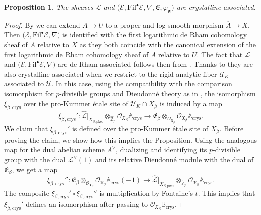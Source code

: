 \documentclass[asterisque,english]{smfart}
\newtheorem{proposition}[theo]{Proposition}
\begin{document}
\begin{proposition}\label{prop:crysass} The sheaves $\mathcal{L}$ and  $\bigl(\mathcal{E},\mathrm{Fil}^\bullet \mathcal{E}, \nabla,\mathfrak{E},\varphi_{\mathfrak{E}}\bigr) $ are crystalline associated.
\end{proposition}
\begin{proof}  By \cite[Thm.~VI.1.1]{FC} we can extend $A\to U$ to a proper and log smooth morphism $\overline{A}\to X$.  Then $ \bigl(\mathcal{E},\mathrm{Fil}^\bullet \mathcal{E}, \nabla\bigr)$ is identified with the first logarithmic de Rham cohomology sheaf of $\overline{A}$ relative to $X$ as they both coincide with the canonical extension of the first logarithmic de Rham cohomology sheaf of $A$ relative to $U$. The fact that $\mathcal{L}$ and $ \bigl(\mathcal{E},\mathrm{Fil}^\bullet \mathcal{E}, \nabla\bigr)$  are de Rham associated follows then from \cite[Theorem 3.2.7(5)]{DLLZb}.
Thanks to  \cite[Theorem 5.5]{TT} they are also crystalline associated when we restrict to the rigid analytic 
fiber $\mathcal{U}_K$ associated to $\mathcal{U}$.  In this case, using the compatibility with the comparison isomorphism for $p$-divisible groups and Dieudonn\'e theory as in \cite[\S 3.5]{SW},
the isomorphism $\xi_{\beta,\mathrm{crys}}$  over the pro-Kummer \'etale site of $\mathcal{U}_K \cap X_{\beta} $  is induced by a map 
$$\xi_{\beta,\mathrm{crys}}'\colon \widehat{\mathcal{L}}\vert_{X_{\beta,\mathrm{pket}}}\otimes_{\widehat{\mathbb{Z}}_p} \mathcal{O}_{\mathfrak{X}_\beta} \mathbb{A}_{\mathrm{crys}}\longrightarrow  \mathfrak{E}_\beta\otimes_{\mathcal{O}_{\mathfrak{X}_\beta}}  \mathcal{O}_{\mathfrak{X}_\beta}\mathbb{A}_{\mathrm{crys}}.$$We claim that $\xi_{\beta,\mathrm{crys}}'$ is defined over the pro-Kummer \'etale site of $X_{\beta} $. Before proving the claim, we show how this implies the Proposition. Using the analogous map for the dual abelian scheme $A^\vee$, dualizing and identifying its $p$-divisible group with the dual $\mathcal{L}^\vee(1)$ and its relative Dieudonn\'e module with the dual of $\mathfrak{E}_\beta$,  we get a map  $$\xi_{\beta,\mathrm{crys}}''\colon  \mathfrak{E}_\beta\otimes_{\mathcal{O}_{\mathfrak{X}_\beta}}  \mathcal{O}_{\mathfrak{X}_\beta}\mathbb{A}_{\mathrm{crys}}(-1)\longrightarrow \widehat{\mathcal{L}}\vert_{X_{\beta,\mathrm{pket}}}\otimes_{\widehat{\mathbb{Z}}_p} \mathcal{O}_{\mathfrak{X}_\beta} \mathbb{A}_{\mathrm{crys}}.$$The composite $\xi_{\beta,\mathrm{crys}}' \circ \xi_{\beta,\mathrm{crys}}''$ is multiplication by Fontaine's $t$. %
This implies that $\xi_{\beta,\mathrm{crys}}'$ defines an isomorphism after passing to $\mathcal{O}_{\mathfrak{X}_\beta}\mathbb{B}_{\mathrm{crys}}$.






\end{proof}
\end{document}
